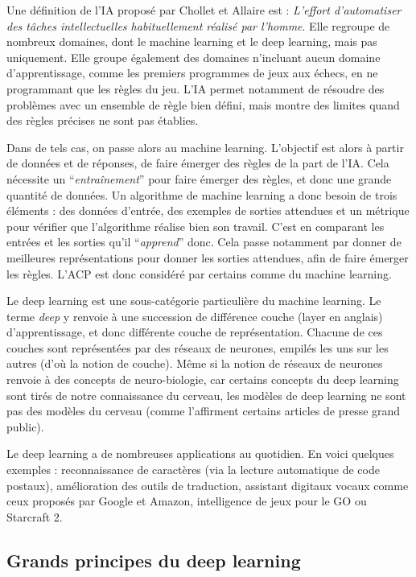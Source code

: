 \documentclass[
]{article}
\begin{document}
Une définition de l'IA proposé par Chollet et Allaire est :
\emph{L'effort d'automatiser des tâches intellectuelles habituellement
réalisé par l'homme}. Elle regroupe de nombreux domaines, dont le
machine learning et le deep learning, mais pas uniquement. Elle groupe
également des domaines n'incluant aucun domaine d'apprentissage, comme
les premiers programmes de jeux aux échecs, en ne programmant que les
règles du jeu. L'IA permet notamment de résoudre des problèmes avec un
ensemble de règle bien défini, mais montre des limites quand des règles
précises ne sont pas établies.

Dans de tels cas, on passe alors au machine learning. L'objectif est
alors à partir de données et de réponses, de faire émerger des règles de
la part de l'IA. Cela nécessite un ``\emph{entraînement}'' pour faire
émerger des règles, et donc une grande quantité de données. Un
algorithme de machine learning a donc besoin de trois éléments : des
données d'entrée, des exemples de sorties attendues et un métrique pour
vérifier que l'algorithme réalise bien son travail. C'est en comparant
les entrées et les sorties qu'il ``\emph{apprend}'' donc. Cela passe
notamment par donner de meilleures représentations pour donner les
sorties attendues, afin de faire émerger les règles. L'ACP est donc
considéré par certains comme du machine learning.

Le deep learning est une sous-catégorie particulière du machine
learning. Le terme \emph{deep} y renvoie à une succession de différence
couche (layer en anglais) d'apprentissage, et donc différente couche de
représentation. Chacune de ces couches sont représentées par des réseaux
de neurones, empilés les uns sur les autres (d'où la notion de couche).
Même si la notion de réseaux de neurones renvoie à des concepts de
neuro-biologie, car certains concepts du deep learning sont tirés de
notre connaissance du cerveau, les modèles de deep learning ne sont pas
des modèles du cerveau (comme l'affirment certains articles de presse
grand public).

Le deep learning a de nombreuses applications au quotidien. En voici
quelques exemples : reconnaissance de caractères (via la lecture
automatique de code postaux), amélioration des outils de traduction,
assistant digitaux vocaux comme ceux proposés par Google et Amazon,
intelligence de jeux pour le GO ou Starcraft 2.

\hypertarget{grands-principes-du-deep-learning}{%
\subsection{Grands principes du deep
learning}\label{grands-principes-du-deep-learning}}
\end{document}
